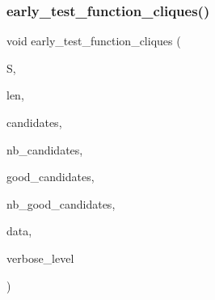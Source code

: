 \subsubsection{\texorpdfstring{early\+\_\+test\+\_\+function\+\_\+cliques()}{early\_test\_function\_cliques()}}
{\footnotesize\ttfamily void early\+\_\+test\+\_\+function\+\_\+cliques (\begin{DoxyParamCaption}\item[{\mbox{\hyperlink{galois_8h_a09fddde158a3a20bd2dcadb609de11dc}{I\+NT}} $\ast$}]{S,  }\item[{\mbox{\hyperlink{galois_8h_a09fddde158a3a20bd2dcadb609de11dc}{I\+NT}}}]{len,  }\item[{\mbox{\hyperlink{galois_8h_a09fddde158a3a20bd2dcadb609de11dc}{I\+NT}} $\ast$}]{candidates,  }\item[{\mbox{\hyperlink{galois_8h_a09fddde158a3a20bd2dcadb609de11dc}{I\+NT}}}]{nb\+\_\+candidates,  }\item[{\mbox{\hyperlink{galois_8h_a09fddde158a3a20bd2dcadb609de11dc}{I\+NT}} $\ast$}]{good\+\_\+candidates,  }\item[{\mbox{\hyperlink{galois_8h_a09fddde158a3a20bd2dcadb609de11dc}{I\+NT}} \&}]{nb\+\_\+good\+\_\+candidates,  }\item[{void $\ast$}]{data,  }\item[{\mbox{\hyperlink{galois_8h_a09fddde158a3a20bd2dcadb609de11dc}{I\+NT}}}]{verbose\+\_\+level }\end{DoxyParamCaption})}

\mbox{\label{all__cliques_8_c_a76a03ce559765dd64a7e21f553acb888}} 
